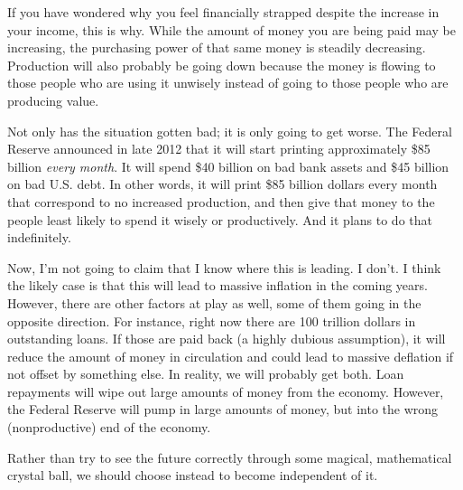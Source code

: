 If you have wondered why you feel financially strapped despite the
increase in your income, this is why. While the amount of money you are
being paid may be increasing, the purchasing power of that same money
is steadily decreasing. Production will also probably be going down
because the money is flowing to those people who are using it unwisely
instead of going to those people who are producing value.

Not only has the situation gotten bad; it is only going to get worse.
The Federal Reserve announced in late 2012 that it will start printing
approximately \$85 billion \textit{every month}. It will spend \$40
billion on bad bank assets and \$45 billion on bad U.S. debt. In other
words, it will print \$85 billion dollars every month that correspond
to no increased production, and then give that money to the people
least likely to spend it wisely or productively. And it plans to do
that indefinitely.

Now, I’m not going to claim that I know where this is leading. I don’t.
I think the likely case is that this will lead to massive inflation in
the coming years. 
However, there are other factors at play as well, some of them going in
the opposite direction.  For instance, right now there are 100 trillion
dollars in outstanding loans. If those are paid back (a highly dubious
assumption), it will reduce the amount of money in circulation and could
lead to massive deflation if not offset by
something else.  In reality, we will probably get both. Loan repayments
will wipe out large amounts of money from the economy.  However, the
Federal Reserve will pump in large amounts of money, but into the wrong
(nonproductive) end of the economy.  

Rather than try to see the future correctly through some magical,
mathematical crystal ball, we should choose instead to become
independent of it.

